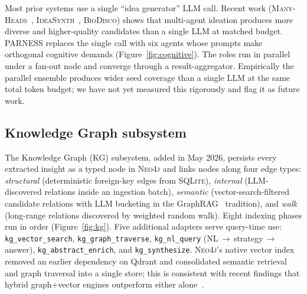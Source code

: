\documentclass{article}
\newcommand{\parness}{\textsf{PARNESS}}
\newcommand{\code}[1]{\texttt{\small #1}}
\begin{document}
Most prior systems use a single ``idea generator'' LLM call. Recent work
(\textsc{Many-Heads}~\cite{manyheads},
\textsc{IdeaSynth}~\cite{ideasynth}, \textsc{BioDisco}) shows that
multi-agent ideation produces more diverse and higher-quality candidates
than a single LLM at matched budget. \parness{} replaces the single call
with six agents whose prompts make orthogonal cognitive demands
(Figure~\ref{fig:cognitive}). The roles run in parallel under a fan-out
node and converge through a result-aggregator. Empirically the parallel
ensemble produces wider seed coverage than a single LLM at the same
total token budget; we have not yet measured this rigorously and flag it
as future work.

\subsection{Knowledge Graph subsystem}
\label{sec:kg}

The Knowledge Graph (KG) subsystem, added in May 2026, persists every
extracted insight as a typed node in \textsc{Neo4j} and links nodes
along four edge types: \emph{structural} (deterministic foreign-key
edges from \textsc{SQLite}), \emph{internal} (LLM-discovered relations
inside an ingestion batch), \emph{semantic} (vector-search-filtered
candidate relations with LLM bucketing in the GraphRAG~\cite{graphrag}
tradition), and \emph{walk} (long-range relations discovered by weighted
random walk). Eight indexing phases run in order
(Figure~\ref{fig:kg}). Five additional adapters serve query-time use:
\code{kg\_vector\_search}, \code{kg\_graph\_traverse}, \code{kg\_nl\_query}
(NL\,$\to$\,strategy\,$\to$\,answer), \code{kg\_abstract\_enrich}, and
\code{kg\_synthesize}. \textsc{Neo4j}'s native vector index removed an
earlier dependency on Qdrant and consolidated semantic retrieval and
graph traversal into a single store; this is consistent with recent
findings that hybrid graph+vector engines outperform either
alone~\cite{tigervector}.
\end{document}
